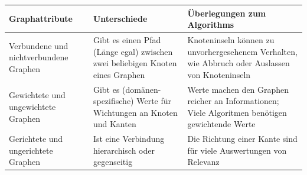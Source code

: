 \documentclass[ngerman,]{scrreprt}
\begin{document}
\begin{longtable}[]{@{}lll@{}}
\toprule
\begin{minipage}[b]{0.22\columnwidth}\raggedright
Graphattribute\strut
\end{minipage} & \begin{minipage}[b]{0.26\columnwidth}\raggedright
Unterschiede\strut
\end{minipage} & \begin{minipage}[b]{0.44\columnwidth}\raggedright
Überlegungen zum Algorithms\strut
\end{minipage}\tabularnewline
\midrule
\endhead
\begin{minipage}[t]{0.22\columnwidth}\raggedright
Verbundene und nichtverbundene Graphen\strut
\end{minipage} & \begin{minipage}[t]{0.26\columnwidth}\raggedright
Gibt es einen Pfad (Länge egal) zwischen zwei beliebigen Knoten eines Graphen\strut
\end{minipage} & \begin{minipage}[t]{0.44\columnwidth}\raggedright
Knoteninseln können zu unvorhergesehenem Verhalten, wie Abbruch oder Auslassen von Knoteninseln\strut
\end{minipage}\tabularnewline
\begin{minipage}[t]{0.22\columnwidth}\raggedright
Gewichtete und ungewichtete Graphen\strut
\end{minipage} & \begin{minipage}[t]{0.26\columnwidth}\raggedright
Gibt es (domänen-spezifische) Werte für Wichtungen an Knoten und Kanten\strut
\end{minipage} & \begin{minipage}[t]{0.44\columnwidth}\raggedright
Werte machen den Graphen reicher an Informationen; Viele Algoritmen benötigen gewichtende Werte\strut
\end{minipage}\tabularnewline
\begin{minipage}[t]{0.22\columnwidth}\raggedright
Gerichtete und ungerichtete Graphen\strut
\end{minipage} & \begin{minipage}[t]{0.26\columnwidth}\raggedright
Ist eine Verbindung hierarchisch oder gegenseitig\strut
\end{minipage} & \begin{minipage}[t]{0.44\columnwidth}\raggedright
Die Richtung einer Kante sind für viele Auswertungen von Relevanz\strut
\end{minipage}\tabularnewline

\end{longtable}
\end{document}
